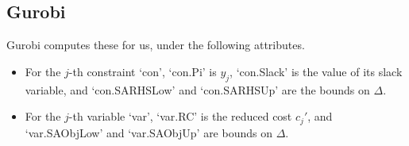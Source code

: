 \documentclass[11pt,a4paper]{article} %
\begin{document}
\subsection{Gurobi}
Gurobi computes these for us, under the following attributes.
\begin{itemize}
    \item For the $j$-th constraint `con', `con.Pi' 
    is $y_j$, `con.Slack' is the value of its slack variable, and
    `con.SARHSLow' and `con.SARHSUp' are the bounds on $\Delta$.
    \item For the $j$-th variable `var', `var.RC' is the reduced cost $c_j'$,
    and `var.SAObjLow' and `var.SAObjUp' are bounds on $\Delta$.
\end{itemize}
\end{document}
